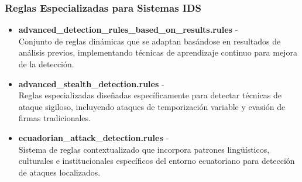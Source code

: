 \subsubsection*{Reglas Especializadas para Sistemas IDS}
\begin{itemize}
    \item \textbf{advanced\_detection\_rules\_based\_on\_results.rules} -  \\
    Conjunto de reglas dinámicas que se adaptan basándose en resultados de análisis previos, implementando técnicas de aprendizaje continuo para mejora de la detección.
    
    \item \textbf{advanced\_stealth\_detection.rules} -  \\
    Reglas especializadas diseñadas específicamente para detectar técnicas de ataque sigiloso, incluyendo ataques de temporización variable y evasión de firmas tradicionales.
    
    \item \textbf{ecuadorian\_attack\_detection.rules} -  \\
    Sistema de reglas contextualizado que incorpora patrones lingüísticos, culturales e institucionales específicos del entorno ecuatoriano para detección de ataques localizados.
\end{itemize}


